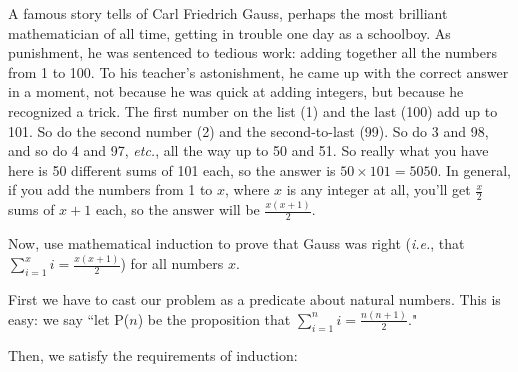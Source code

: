A famous story tells of Carl Friedrich Gauss, perhaps the most brilliant
mathematician of all time, getting in trouble one day as a schoolboy. As
punishment, he was sentenced to tedious work: adding together all the
numbers from 1 to 100. To his teacher's astonishment, he came up with the
correct answer in a moment, not because he was quick at adding integers,
but because he recognized a trick. The first number on the list (1) and the
last (100) add up to 101. So do the second number (2) and the
second-to-last (99). So do 3 and 98, and so do 4 and 97, \textit{etc.}, all
the way up to 50 and 51. So really what you have here is 50 different sums
of 101 each, so the answer is $50\times 101 = 5050$. In general, if you add
the numbers from 1 to $x$, where $x$ is any integer at all, you'll get
$\frac{x}{2}$ sums of $x+1$ each, so the answer will be $\frac{x(x+1)}{2}$.

Now, use mathematical induction to prove that Gauss was right
(\textit{i.e.}, that $\sum_{i=1}^x{i} = \frac{x(x+1)}{2}$) for all numbers
$x$.

First we have to cast our problem as a predicate about natural numbers.
This is easy: we say ``let P($n$) be the proposition that $\sum_{i=1}^n{i}
= \frac{n(n+1)}{2}$."

Then, we satisfy the requirements of induction:

